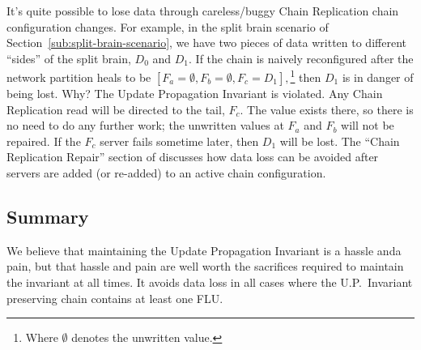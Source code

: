 \documentclass[preprint,10pt]{sigplanconf}
\begin{document}
It's quite possible to lose data through careless/buggy Chain
Replication chain configuration changes.  For example, in the split
brain scenario of Section~\ref{sub:split-brain-scenario}, we have two
pieces of data written to different ``sides'' of the split brain,
$D_0$ and $D_1$.  If the chain is naively reconfigured after the network
partition heals to be $[F_a=\emptyset,F_b=\emptyset,F_c=D_1],$\footnote{Where $\emptyset$
  denotes the unwritten value.} then $D_1$
is in danger of being lost.  Why?
The Update Propagation Invariant is violated.
Any Chain Replication read will be
directed to the tail, $F_c$.  The value exists there, so there is no
need to do any further work; the unwritten values at $F_a$ and $F_b$
will not be repaired.  If the $F_c$ server fails sometime
later, then $D_1$ will be lost.  The ``Chain Replication Repair''
section of \cite{machi-design} discusses
how data loss can be avoided after servers are added (or re-added) to
an active chain configuration.

\subsection{Summary}

We believe that maintaining the Update Propagation Invariant is a
hassle anda pain, but that hassle and pain are well worth the
sacrifices required to maintain the invariant at all times.  It avoids
data loss in all cases where the U.P.~Invariant preserving chain
contains at least one FLU.
\end{document}
